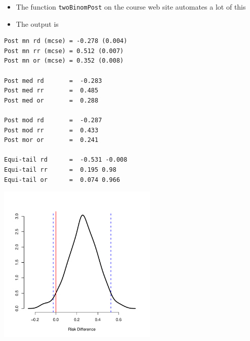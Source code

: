 \documentclass[aspectratio=169]{beamer}
\begin{document}
\begin{frame}[fragile]
  \begin{itemize}
  \item The function \texttt{twoBinomPost} on the course web site automates a lot of this
  \item The output is
  \end{itemize}
\begin{verbatim}
Post mn rd (mcse) = -0.278 (0.004)
Post mn rr (mcse) = 0.512 (0.007)
Post mn or (mcse) = 0.352 (0.008)

Post med rd       =  -0.283 
Post med rr       =  0.485 
Post med or       =  0.288 

Post mod rd       =  -0.287 
Post mod rr       =  0.433 
Post mor or       =  0.241 

Equi-tail rd      =  -0.531 -0.008 
Equi-tail rr      =  0.195 0.98 
Equi-tail or      =  0.074 0.966 
\end{verbatim}
\end{frame}

\begin{frame}
  \begin{center}
    \includegraphics[height=3in]{MCposterior2sampleBinom.pdf}
  \end{center}
\end{frame}
\end{document}
